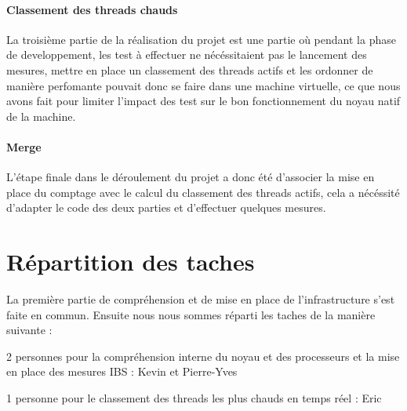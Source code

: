 		\paragraph{Classement des threads chauds}
			La troisième partie de la réalisation du projet est une partie où pendant la phase de developpement, les test à effectuer ne nécéssitaient pas le lancement des mesures, mettre en place un classement des threads actifs et les ordonner de manière perfomante pouvait donc se faire dans une machine virtuelle, ce que nous avons fait pour limiter l'impact des test sur le bon fonctionnement du noyau natif de la machine.
		\paragraph{Merge}
			L'étape finale dans le déroulement du projet a donc été d'associer la mise en place du comptage avec le calcul du classement des threads actifs, cela a nécéssité d'adapter le code des deux parties et d'effectuer quelques mesures.
	\section{Répartition des taches}
		La première partie de compréhension et de mise en place de l'infrastructure s'est faite en commun. Ensuite nous nous sommes réparti les taches de la manière suivante : 
		\bitem
			\item{2 personnes pour la compréhension interne du noyau et des processeurs et la mise en place des mesures IBS : Kevin et Pierre-Yves}
			\item{1 personne pour le classement des threads les plus chauds en temps réel : Eric}
		\eitem
	
